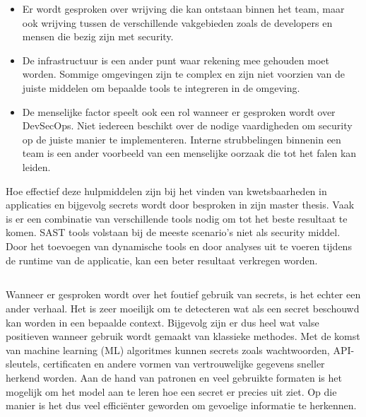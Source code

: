 \begin{itemize}
  \item Er wordt gesproken over wrijving die kan ontstaan binnen het team, maar ook wrijving tussen de verschillende vakgebieden zoals de developers en mensen die bezig zijn met security.
  \item De infrastructuur is een ander punt waar rekening mee gehouden moet worden. Sommige omgevingen zijn te complex en zijn niet voorzien van de juiste middelen om bepaalde tools te integreren in de omgeving.
  \item De menselijke factor speelt ook een rol wanneer er gesproken wordt over DevSecOps. Niet iedereen beschikt over de nodige vaardigheden om security op de juiste manier te implementeren. Interne strubbelingen binnenin een team is een ander voorbeeld van een menselijke oorzaak die tot het falen kan leiden.
\end{itemize}

Hoe effectief deze hulpmiddelen zijn bij het vinden van kwetsbaarheden in applicaties en bijgevolg secrets wordt door \textcite{Thulin2015} besproken in zijn master thesis. Vaak is er een combinatie van verschillende tools nodig om tot het beste resultaat te komen. SAST tools volstaan bij de meeste scenario's niet als security middel. Door het toevoegen van dynamische tools en door analyses uit te voeren tijdens de runtime van de applicatie, kan een beter resultaat verkregen worden. 

\subsection{}
\label{sec:DevSecOps tools om secrets te herkennen en beheren}

Wanneer er gesproken wordt over het foutief gebruik van secrets, is het echter een ander verhaal. Het is zeer moeilijk om te detecteren wat als een secret beschouwd kan worden in een bepaalde context. Bijgevolg zijn er dus heel wat valse positieven wanneer gebruik wordt gemaakt van klassieke methodes. Met de komst van machine learning (ML) algoritmes kunnen secrets zoals wachtwoorden, API-sleutels, certificaten en andere vormen van vertrouwelijke gegevens sneller herkend worden. Aan de hand van patronen en veel gebruikte formaten is het mogelijk om het model aan te leren hoe een secret er precies uit ziet. Op die manier is het dus veel efficiënter geworden om gevoelige informatie te herkennen. \autocite{Saha2020}

